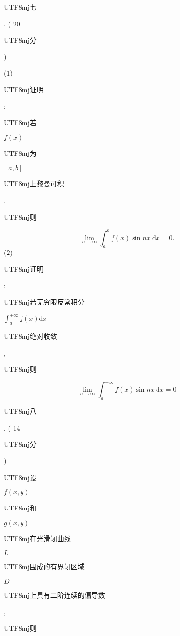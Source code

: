 \documentclass[10pt]{article}
\begin{document}
\begin{CJK}{UTF8}{mj}七\end{CJK}. ( 20 \begin{CJK}{UTF8}{mj}分\end{CJK})

(1) \begin{CJK}{UTF8}{mj}证明\end{CJK}: \begin{CJK}{UTF8}{mj}若\end{CJK} $f(x)$ \begin{CJK}{UTF8}{mj}为\end{CJK} $[a, b]$ \begin{CJK}{UTF8}{mj}上黎曼可积\end{CJK}, \begin{CJK}{UTF8}{mj}则\end{CJK}
$$
\lim _{n \rightarrow \infty} \int_{a}^{b} f(x) \sin n x \mathrm{~d} x=0 .
$$
(2) \begin{CJK}{UTF8}{mj}证明\end{CJK}: \begin{CJK}{UTF8}{mj}若无穷限反常积分\end{CJK} $\int_{a}^{+\infty} f(x) \mathrm{d} x$ \begin{CJK}{UTF8}{mj}绝对收敛\end{CJK}, \begin{CJK}{UTF8}{mj}则\end{CJK}
$$
\lim _{n \rightarrow \infty} \int_{a}^{+\infty} f(x) \sin n x \mathrm{~d} x=0
$$
\begin{CJK}{UTF8}{mj}八\end{CJK}. ( 14 \begin{CJK}{UTF8}{mj}分\end{CJK}) \begin{CJK}{UTF8}{mj}设\end{CJK} $f(x, y)$ \begin{CJK}{UTF8}{mj}和\end{CJK} $g(x, y)$ \begin{CJK}{UTF8}{mj}在光滑闭曲线\end{CJK} $L$ \begin{CJK}{UTF8}{mj}围成的有界闭区域\end{CJK} $D$ \begin{CJK}{UTF8}{mj}上具有二阶连续的偏导数\end{CJK}, \begin{CJK}{UTF8}{mj}则\end{CJK}
\end{document}
